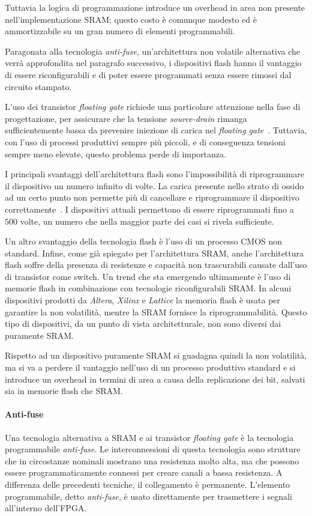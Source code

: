 Tuttavia la logica di programmazione introduce un overhead in area non presente nell'implementazione SRAM; questo costo è comunque modesto ed è ammortizzabile su un gran numero di elementi programmabili.

Paragonata alla tecnologia \textit{anti-fuse}, un'architettura non volatile alternativa che verrà approfondita nel paragrafo successivo, i dispositivi flash hanno il vantaggio di essere riconfigurabili e di poter essere programmati senza essere rimossi dal circuito stampato.

L'uso dei transistor \textit{floating gate} richiede una particolare attenzione nella fase di progettazione, per assicurare che la tensione \textit{source-drain} rimanga sufficientemente bassa da prevenire iniezione di carica nel \textit{floating gate}~\cite{510550}. Tuttavia, con l'uso di processi produttivi sempre più piccoli, e di conseguenza tensioni sempre meno elevate, questo problema perde di importanza.

I principali svantaggi dell'architettura flash sono l'impossibilità di riprogrammare il dispositivo un numero infinito di volte. La carica presente nello strato di ossido ad un certo punto non permette più di cancellare e riprogrammare il dispositivo correttamente~\cite{622505}. I dispositivi attuali permettono di essere riprogrammati fino a $500$ volte, un numero che nella maggior parte dei casi si rivela sufficiente.

Un altro svantaggio della tecnologia flash è l'uso di un processo CMOS non standard. Infine, come già spiegato per l'architettura SRAM, anche l'architettura flash soffre della presenza di resistenze e capacità non trascurabili causate dall'uso di transistor come switch. Un trend che sta emergendo ultimamente è l'uso di memorie flash in combinazione con tecnologie riconfigurabili SRAM. In alcuni dispositivi prodotti da \textit{Altera}, \textit{Xilinx} e \textit{Lattice} la memoria flash è usata per garantire la non volatilità, mentre la SRAM fornisce la riprogrammabilità. Questo tipo di dispositivi, da un punto di vista architetturale, non sono diversi dai puramente SRAM.

Rispetto ad un dispositivo puramente SRAM si guadagna quindi la non volatilità, ma si va a perdere il vantaggio nell'uso di un  processo produttivo standard e si introduce un overhead in termini di area a causa della replicazione dei bit, salvati sia in memorie flash che SRAM.

\paragraph{Anti-fuse}
Una tecnologia alternativa a SRAM e ai transistor \textit{floating gate} è la tecnologia programmabile \textit{anti-fuse}. Le interconnessioni di questa tecnologia sono strutture che in circostanze nominali mostrano una resistenza molto alta, ma che possono essere programmaticamente connessi per creare canali a bassa resistenza. A differenza delle precedenti tecniche, il collegamento è permanente. L'elemento programmabile, detto \textit{anti-fuse}, è usato direttamente per trasmettere i segnali all'interno dell'FPGA.

